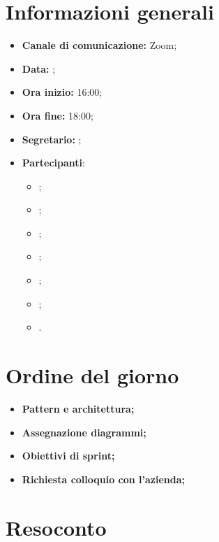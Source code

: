 \section{Informazioni generali}

\begin{itemize}

    \item \textbf{Canale di comunicazione:} Zoom;

    \item \textbf{Data:} \DataMeeting{};

    \item \textbf{Ora inizio:} 16:00;

    \item \textbf{Ora fine:} 18:00;

    \item \textbf{Segretario:} \ACapoRedazione{};

    \item \textbf{Partecipanti}: 
        \begin{itemize}
            \item \Daniele{};
            \item \Davide{};
            \item \Francesco{};
            \item \Giosue{};
            \item \Lucrezia{};
            \item \Matteo{};
            \item \Tommaso{}.
        \end{itemize}
\end{itemize}

\section{Ordine del giorno}

\begin{itemize}
    \item\textbf{Pattern e architettura;}
    \item\textbf{Assegnazione diagrammi;}
    \item\textbf{Obiettivi di sprint;}
    \item\textbf{Richiesta colloquio con l'azienda;}
\end{itemize}
\newpage


\section{Resoconto}
